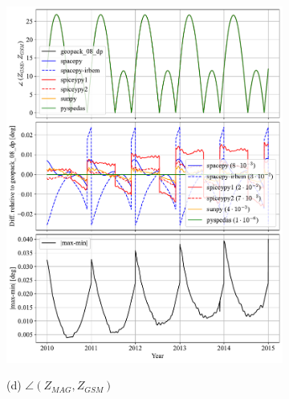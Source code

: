 \documentclass[draft]{agujournal2019}
\begin{document}
\begin{figure}[htb]
\begin{subfigure}[b]{0.49\textwidth}
         \includegraphics[width=\textwidth]{code/figures/angles/delta=1days_20100101-20150101/GSE_GSM.pdf}
     \end{subfigure}
     \begin{subfigure}[b]{0.49\textwidth}
         (d) $\angle (Z_{MAG}, Z_{GSM})$
         \centering

\end{subfigure}
\end{figure}
\end{document}
